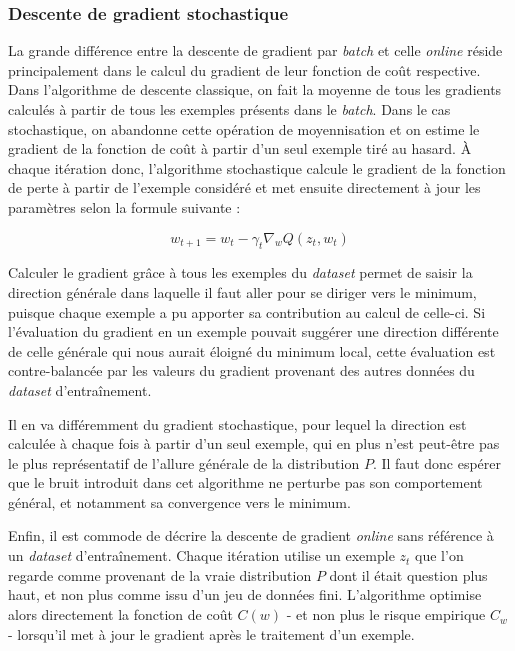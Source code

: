 \documentclass{article}
\begin{document}
\subsubsection{Descente de gradient stochastique}

La grande différence entre la descente de gradient par \emph{batch} et celle \emph{online} réside principalement dans le calcul du gradient de leur fonction de coût respective. Dans l'algorithme de descente classique, on fait la moyenne de tous les gradients calculés à partir de tous les exemples présents dans le \emph{batch}. Dans le cas stochastique, on abandonne cette opération de moyennisation et on estime le gradient de la fonction de coût à partir d'un seul exemple tiré au hasard. À chaque itération donc, l'algorithme stochastique calcule le gradient de la fonction de perte à partir de l'exemple considéré et met ensuite directement à jour les paramètres selon la formule suivante : 

\begin{equation}
    w_{t+1} = w_t - \gamma_t \nabla_w Q(z_t, w_t)
\end{equation}

Calculer le gradient grâce à tous les exemples du \emph{dataset} permet de saisir la direction générale dans laquelle il faut aller pour se diriger vers le minimum, puisque chaque exemple a pu apporter sa contribution au calcul de celle-ci. Si l'évaluation du gradient en un exemple pouvait suggérer une direction différente de celle générale qui nous aurait éloigné du minimum local, cette évaluation est contre-balancée par les valeurs du gradient provenant des autres données du \emph{dataset} d'entraînement.
\bigskip

Il en va différemment du gradient stochastique, pour lequel la direction est calculée à chaque fois à partir d'un seul exemple, qui en plus n'est peut-être pas le plus représentatif de l'allure générale de la distribution $P$. Il faut donc espérer que le bruit introduit dans cet algorithme ne perturbe pas son comportement général, et notamment sa convergence vers le minimum.
\bigskip

Enfin, il est commode de décrire la descente de gradient \emph{online} sans référence à un \emph{dataset} d'entraînement. Chaque itération utilise un exemple $z_t$ que l'on regarde comme provenant de la vraie distribution $P$ dont il était question plus haut, et non plus comme issu d'un jeu de données fini. L'algorithme optimise alors directement la fonction de coût $C(w)$ - et non plus le risque empirique $\hat{C}_w$ - lorsqu'il met à jour le gradient après le traitement d'un exemple.  
\end{document}
